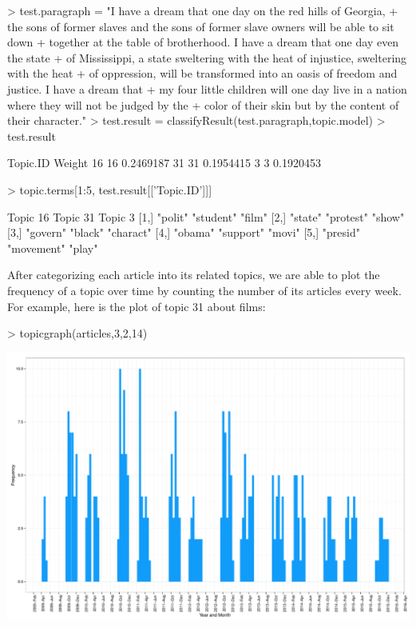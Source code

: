 \documentclass[a4paper]{article}
\begin{document}
\begin{Schunk}
\begin{Sinput}
> test.paragraph = "I have a dream that one day on the red hills of Georgia, 
+ the sons of former slaves and the sons of former slave owners will be able to sit down 
+ together at the table of brotherhood. I have a dream that one day even the state 
+ of Mississippi, a state sweltering with the heat of injustice, sweltering with the heat 
+ of oppression, will be transformed into an oasis of freedom and justice. I have a dream that 
+ my four little children will one day live in a nation where they will not be judged by the 
+ color of their skin but by the content of their character."
> test.result = classifyResult(test.paragraph,topic.model)
> test.result
\end{Sinput}
\begin{Soutput}
   Topic.ID    Weight
16       16 0.2469187
31       31 0.1954415
3         3 0.1920453
\end{Soutput}
\begin{Sinput}
> topic.terms[1:5, test.result[['Topic.ID']]]
\end{Sinput}
\begin{Soutput}
     Topic 16 Topic 31   Topic 3  
[1,] "polit"  "student"  "film"   
[2,] "state"  "protest"  "show"   
[3,] "govern" "black"    "charact"
[4,] "obama"  "support"  "movi"   
[5,] "presid" "movement" "play"   
\end{Soutput}
\end{Schunk}

After categorizing each article into its related topics, we are able to plot the frequency of a topic over time by counting the number of its articles every week. For example, here is the plot of topic 31 about films:

\begin{Schunk}
\begin{Sinput}
> topicgraph(articles,3,2,14)
\end{Sinput}
\end{Schunk}
\includegraphics{FinalProject-005}
\end{document}
